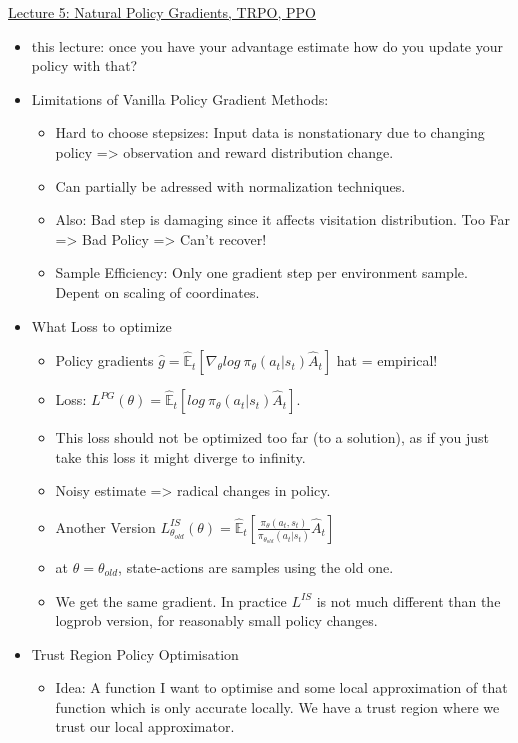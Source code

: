 \href{https://www.youtube.com/watch?v=qaMdN6LS9rA}{Lecture 5: Natural Policy Gradients, TRPO, PPO}\\
\begin{itemize}[noitemsep,nolistsep]
	\item this lecture: once you have your advantage estimate how do you update your policy with that?
	\item Limitations of Vanilla Policy Gradient Methods:
	\begin{itemize}[noitemsep,nolistsep]
		\item Hard to choose stepsizes: Input data is nonstationary due to changing policy => observation and reward distribution change.
		\item Can partially be adressed with normalization techniques.
		\item Also: Bad step is damaging since it affects visitation distribution. Too Far => Bad Policy => Can't recover!
		\item Sample Efficiency: Only one gradient step per environment sample. Depent on scaling of coordinates.
	\end{itemize}
	\item What Loss to optimize
	\begin{itemize}[noitemsep,nolistsep]
		\item Policy gradients $\hat{g} = \hat{\mathbb{E}}_t[\nabla_\theta log\ \pi_\theta(a_t|s_t)\hat{A}_t]$ hat = empirical!
		\item Loss: $L^{PG}(\theta) = \hat{\mathbb{E}}_t[log\ \pi_\theta(a_t|s_t)\hat{A}_t]$.
		\item This loss should not be optimized too far (to a solution), as if you just take this loss it might diverge to infinity.
		\item Noisy estimate => radical changes in policy.
		\item Another Version $L_{\theta_{old}}^{IS}(\theta) = \hat{\mathbb{E}}_t [\frac{\pi_\theta (a_t, s_t)}{\pi_{\theta_{old}}(a_t | s_t)} \hat{A}_t]$
		\item at $\theta = \theta_{old}$, state-actions are samples using the old one.
		\item We get the same gradient. In practice $L^{IS}$ is not much different than the logprob version, for reasonably small policy changes.
	\end{itemize}
	\item Trust Region Policy Optimisation
	\begin{itemize}[noitemsep,nolistsep]
		\item Idea: A function I want to optimise and some local approximation of that function which is only accurate locally. We have a trust region where we trust our local approximator.

\end{itemize}
\end{itemize}
